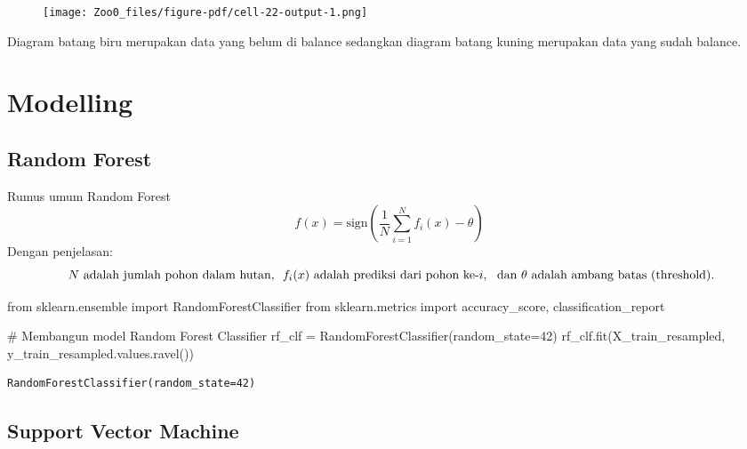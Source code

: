 \documentclass[
  letterpaper,
]{krantz}
\makeatletter
\newenvironment{Shaded}{\begin{snugshade}}{\end{snugshade}}
\newcommand{\CommentTok}[1]{\textcolor[rgb]{0.37,0.37,0.37}{#1}}
\newcommand{\DecValTok}[1]{\textcolor[rgb]{0.68,0.00,0.00}{#1}}
\newcommand{\ImportTok}[1]{\textcolor[rgb]{0.00,0.46,0.62}{#1}}
\newcommand{\NormalTok}[1]{\textcolor[rgb]{0.00,0.23,0.31}{#1}}
\newcommand{\OperatorTok}[1]{\textcolor[rgb]{0.37,0.37,0.37}{#1}}
\newenvironment{kframe}{%
\medskip{}
\setlength{\fboxsep}{.8em}
 \def\at@end@of@kframe{}%
 \ifinner\ifhmode%
  \def\at@end@of@kframe{\end{minipage}}%
  \begin{minipage}{\columnwidth}%
 \fi\fi%
 \def\FrameCommand##1{\hskip\@totalleftmargin \hskip-\fboxsep
 \colorbox{shadecolor}{##1}\hskip-\fboxsep
     \hskip-\linewidth \hskip-\@totalleftmargin \hskip\columnwidth}%
 \MakeFramed {\advance\hsize-\width
   \@totalleftmargin\z@ \linewidth\hsize
   \@setminipage}}%
 {\par\unskip\endMakeFramed%
 \at@end@of@kframe}
\renewenvironment{Shaded}{\begin{kframe}}{\end{kframe}}
\makeatother
\begin{document}
\begin{figure}[H]

{\centering \texttt{[image: Zoo0\_files/figure-pdf/cell-22-output-1.png]}

}

\end{figure}

Diagram batang biru merupakan data yang belum di balance sedangkan
diagram batang kuning merupakan data yang sudah balance.

\hypertarget{modelling}{%
\section{Modelling}\label{modelling}}

\hypertarget{random-forest}{%
\subsection{Random Forest}\label{random-forest}}

Rumus umum Random Forest
\[f(x) = \text{sign}\left(\frac{1}{N} \sum_{i=1}^{N} f_i(x) - \theta\right)
\] Dengan penjelasan:
\[\\\ N \text{ adalah jumlah pohon dalam hutan, } \\\ f_i(x) \text{ adalah prediksi dari pohon ke-} i,\\\ \text{ dan } \theta \text{ adalah ambang batas (threshold).}\]

\begin{Shaded}
\begin{Highlighting}[]
\ImportTok{from}\NormalTok{ sklearn.ensemble }\ImportTok{import}\NormalTok{ RandomForestClassifier}
\ImportTok{from}\NormalTok{ sklearn.metrics }\ImportTok{import}\NormalTok{ accuracy\_score, classification\_report}


\CommentTok{\# Membangun model Random Forest Classifier}
\NormalTok{rf\_clf }\OperatorTok{=}\NormalTok{ RandomForestClassifier(random\_state}\OperatorTok{=}\DecValTok{42}\NormalTok{)}
\NormalTok{rf\_clf.fit(X\_train\_resampled, y\_train\_resampled.values.ravel())}
\end{Highlighting}
\end{Shaded}

\begin{verbatim}
RandomForestClassifier(random_state=42)
\end{verbatim}

\hypertarget{support-vector-machine}{%
\subsection{Support Vector Machine}\label{support-vector-machine}}
\end{document}
